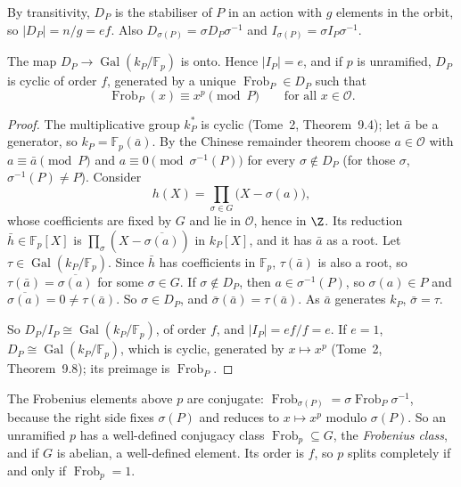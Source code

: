 By transitivity, $D_P$ is the stabiliser of $P$ in an action with $g$ elements in the orbit, so $|D_P|=n/g=ef$. Also
$D_{\sigma(P)}=\sigma D_P\sigma^{-1}$ and $I_{\sigma(P)}=\sigma I_P\sigma^{-1}$.

\begin{theorem}\label{thm:decomp}
The map $D_P\to\operatorname{Gal}(k_P/\mathbb F_p)$ is onto. Hence $|I_P|=e$, and if $p$ is unramified, $D_P$ is cyclic of
order $f$, generated by a unique $\operatorname{Frob}_P\in D_P$ such that
\[
\operatorname{Frob}_P(x)\equiv x^p\pmod P\qquad\text{for all }x\in\mathcal O.
\]
\end{theorem}
\begin{proof}
The multiplicative group $k_P^*$ is cyclic (Tome~2, Theorem~9.4); let $\bar a$ be a generator, so $k_P=\mathbb F_p(\bar
a)$. By the Chinese remainder theorem choose $a\in\mathcal O$ with $a\equiv\bar a\pmod P$ and $a\equiv0\pmod
{\sigma^{-1}(P)}$ for every $\sigma\notin D_P$ (for those $\sigma$, $\sigma^{-1}(P)\ne P$). Consider
\[
h(X)=\prod_{\sigma\in G}\bigl(X-\sigma(a)\bigr),
\]
whose coefficients are fixed by $G$ and lie in $\mathcal O$, hence in $\Z$. Its reduction $\bar h\in\mathbb F_p[X]$ is
$\prod_\sigma(X-\overline{\sigma(a)})$ in $k_P[X]$, and it has $\bar a$ as a root. Let $\tau\in
\operatorname{Gal}(k_P/\mathbb F_p)$. Since $\bar h$ has coefficients in $\mathbb F_p$, $\tau(\bar a)$ is also a root, so
$\tau(\bar a)=\overline{\sigma(a)}$ for some $\sigma\in G$. If $\sigma\notin D_P$, then $a\in\sigma^{-1}(P)$, so
$\sigma(a)\in P$ and $\overline{\sigma(a)}=0\ne\tau(\bar a)$. So $\sigma\in D_P$, and $\bar\sigma(\bar a)=\tau(\bar a)$.
As $\bar a$ generates $k_P$, $\bar\sigma=\tau$.

So $D_P/I_P\cong\operatorname{Gal}(k_P/\mathbb F_p)$, of order $f$, and $|I_P|=ef/f=e$. If $e=1$, $D_P\cong
\operatorname{Gal}(k_P/\mathbb F_p)$, which is cyclic, generated by $x\mapsto x^p$ (Tome~2, Theorem~9.8); its preimage is
$\operatorname{Frob}_P$.
\end{proof}

The Frobenius elements above $p$ are conjugate: $\operatorname{Frob}_{\sigma(P)}=\sigma\operatorname{Frob}_P\sigma^{-1}$,
because the right side fixes $\sigma(P)$ and reduces to $x\mapsto x^p$ modulo $\sigma(P)$. So an unramified $p$ has a
well-defined conjugacy class $\operatorname{Frob}_p\subseteq G$, the \emph{Frobenius class}, and if $G$ is abelian, a
well-defined element. Its order is $f$, so $p$ splits completely if and only if $\operatorname{Frob}_p=1$.

